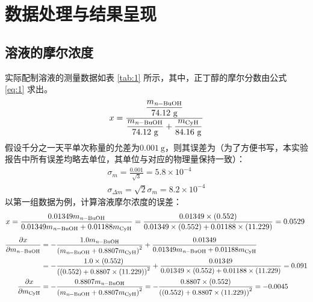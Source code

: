 \documentclass[cn,hazy,pku,12pt,normal,math=newtx,cite=super]{elegantnote}
\begin{document}
\section{数据处理与结果呈现}

\subsection{溶液的摩尔浓度}


实际配制溶液的测量数据如表 \ref{tab:1} 所示，其中，正丁醇的摩尔分数由公式 \eqref{eq:1} 求出。
\begin{equation}\label{eq:1}
    x = \frac{\dfrac{m_{\ce{\textit{n}-BuOH}}}{74.12\mathrm{~g}}}{\dfrac{m_{\ce{\textit{n}-BuOH}}}{74.12\mathrm{~g}}+\dfrac{m_{\ce{CyH}}}{84.16\mathrm{~g}}}
\end{equation}
假设千分之一天平单次称量的允差为$0.001\mathrm{~g}$，则其误差为（为了方便书写，本实验报告中所有误差均略去单位，其单位与对应的物理量保持一致）：
\begin{align*}
    \sigma_m = \frac{0.001}{\sqrt{3}} = 5.8\times 10^{-4} \\
    \sigma_{\Delta m} = \sqrt{2}\sigma_m = 8.2\times 10^{-4} 
\end{align*}
以第一组数据为例，计算溶液摩尔浓度的误差：
\begin{equation*}
x=\frac{0.01349 m_{\ce{\textit{n}-BuOH}}}{0.01349 m_{\ce{\textit{n}-BuOH}} + 0.01188 m_{\ce{CyH}}}=\frac{0.01349 \times \left(0.552\right)}{0.01349 \times \left(0.552\right) + 0.01188 \times \left(11.229\right)}=0.0529\  
\end{equation*}
\begin{equation*}
\begin{aligned}
\frac{\partial x }{\partial m_{\ce{\textit{n}-BuOH}} }&=- \frac{1.0 m_{\ce{\textit{n}-BuOH}}}{\left(m_{\ce{\textit{n}-BuOH}} + 0.8807 m_{\ce{CyH}}\right)^{2}} + \frac{0.01349}{0.01349 m_{\ce{\textit{n}-BuOH}} + 0.01188 m_{\ce{CyH}}}\\
{}&=- \frac{1.0 \times \left(0.552\right)}{\left(\left(0.552\right) + 0.8807 \times \left(11.229\right)\right)^{2}} + \frac{0.01349}{0.01349 \times \left(0.552\right) + 0.01188 \times \left(11.229\right)}=0.091\\
\frac{\partial x }{\partial m_{\ce{CyH}} }&=- \frac{0.8807 m_{\ce{\textit{n}-BuOH}}}{\left(m_{\ce{\textit{n}-BuOH}} + 0.8807 m_{\ce{CyH}}\right)^{2}}=- \frac{0.8807 \times \left(0.552\right)}{\left(\left(0.552\right) + 0.8807 \times \left(11.229\right)\right)^{2}}=-0.0045\\
\end{aligned}
\end{equation*}
\end{document}
